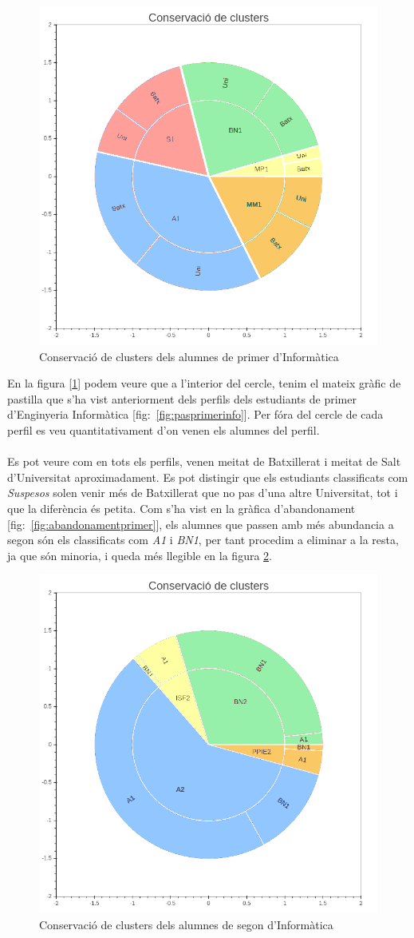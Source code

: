 \documentclass[12pt,a4paper,catalan]{article}
\begin{document}
\begin{figure}[h]
\centering
\includegraphics[width=.6\linewidth]{img/conservacio_clusters_primer_info.png}
\caption{Conservació de clusters dels alumnes de primer d'Informàtica}
\label{fig:ccei1}
\end{figure}

En la figura [\ref{fig:ccei1}] podem veure que a l'interior del cercle, tenim el mateix gràfic de pastilla que s'ha vist anteriorment dels perfils dels estudiants de primer d'Enginyeria Informàtica [fig:~\ref{fig:pasprimerinfo}]. Per fóra del cercle de cada perfil es veu quantitativament d'on venen els alumnes del perfil. 
\\
\\
Es pot veure com en tots els perfils, venen meitat de Batxillerat i meitat de Salt d'Universitat aproximadament. Es pot distingir que els estudiants classificats com \textit{Suspesos} solen venir més de Batxillerat que no pas d'una altre Universitat, tot i que la diferència és petita. Com s'ha vist en la gràfica d'abandonament [fig:~\ref{fig:abandonamentprimer}], els alumnes que passen amb més abundancia a segon són els classificats com \textit{A1} i \textit{BN1}, per tant procedim a eliminar a la resta, ja que són minoria, i queda més llegible en la figura \ref{fig:ccei2}.

\begin{figure}[h]
\centering
\includegraphics[width=.6\linewidth]{img/conservacio_clusters_segon_info.png}
\caption{Conservació de clusters dels alumnes de segon d'Informàtica}
\label{fig:ccei2}
\end{figure}
\end{document}
